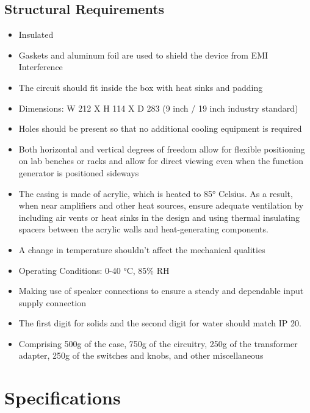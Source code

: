 \documentclass[12pt,a4paper]{article}
\begin{document}
\subsection{Structural Requirements}
\begin{itemize}
    \item Insulated
    \item Gaskets and aluminum foil are used to shield the device from \gls{EMI} Interference
    \item The circuit should fit inside the box with heat sinks and padding
    \item Dimensions: W 212 X H 114 X D 283 (9 inch / 19 inch industry standard) \parencite{iec60297_3_100_2008}
    \item Holes should be present so that no additional cooling equipment is required
    \item Both horizontal and vertical degrees of freedom allow for flexible positioning on lab benches or racks and allow for direct viewing even when the function generator is positioned sideways
    \item The casing is made of acrylic, which is heated to 85° Celsius. As a result, when near amplifiers and other heat sources, ensure adequate ventilation by including air vents or heat sinks in the design and using thermal insulating spacers between the acrylic walls and heat-generating components. 
    \item A change in temperature shouldn't affect the mechanical qualities
    \item Operating Conditions: 0-40 °C, 85\% RH \parencite{scientech4064s}
    \item Making use of speaker connections to ensure a steady and dependable input supply connection
    \item The first digit for solids and the second digit for water should match IP 20. \parencite{isolite_ip_rating_chart}
    \item  Comprising 500g of the case, 750g of the circuitry, 250g of the transformer adapter, 250g of the switches and knobs, and other miscellaneous  \parencite{scientech4064s}
\end{itemize}











\section{Specifications}
\end{document}
